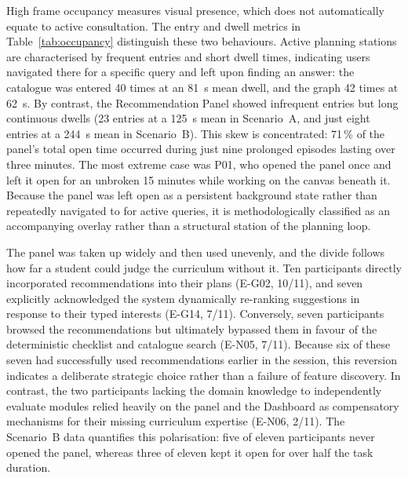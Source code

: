 High frame occupancy measures visual presence, which does not automatically equate to active consultation. The entry and dwell metrics in Table~\ref{tab:occupancy} distinguish these two behaviours. Active planning stations are characterised by frequent entries and short dwell times, indicating users navigated there for a specific query and left upon finding an answer: the catalogue was entered 40 times at an 81~s mean dwell, and the graph 42 times at 62~s. By contrast, the Recommendation Panel showed infrequent entries but long continuous dwells (23 entries at a 125~s mean in Scenario~A, and just eight entries at a 244~s mean in Scenario~B). This skew is concentrated: 71\,\% of the panel's total open time occurred during just nine prolonged episodes lasting over three minutes. The most extreme case was P01, who opened the panel once and left it open for an unbroken 15 minutes while working on the canvas beneath it. Because the panel was left open as a persistent background state rather than repeatedly navigated to for active queries, it is methodologically classified as an accompanying overlay rather than a structural station of the planning loop.

The panel was taken up widely and then used unevenly, and the divide follows how far a student could judge the curriculum without it. Ten participants directly incorporated recommendations into their plans (E-G02, 10/11), and seven explicitly acknowledged the system dynamically re-ranking suggestions in response to their typed interests (E-G14, 7/11). Conversely, seven participants browsed the recommendations but ultimately bypassed them in favour of the deterministic checklist and catalogue search (E-N05, 7/11). Because six of these seven had successfully used recommendations earlier in the session, this reversion indicates a deliberate strategic choice rather than a failure of feature discovery. In contrast, the two participants lacking the domain knowledge to independently evaluate modules relied heavily on the panel and the Dashboard as compensatory mechanisms for their missing curriculum expertise (E-N06, 2/11). The Scenario~B data quantifies this polarisation: five of eleven participants never opened the panel, whereas three of eleven kept it open for over half the task duration.

